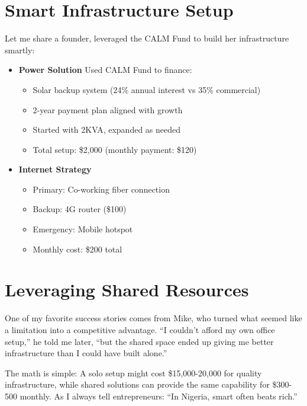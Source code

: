 \section{Smart Infrastructure Setup}\label{sec:smart-infrastructure}

Let me share a founder, leveraged the CALM Fund to build her infrastructure smartly:

\begin{itemize}
    \item \textbf{Power Solution}
    Used CALM Fund to finance:
    \begin{itemize}
        \item Solar backup system (24\% annual interest vs 35\% commercial)
        \item 2-year payment plan aligned with growth
        \item Started with 2KVA, expanded as needed
        \item Total setup: \$2,000 (monthly payment: \$120)
    \end{itemize}

    \item \textbf{Internet Strategy}
    \begin{itemize}
        \item Primary: Co-working fiber connection
        \item Backup: 4G router (\$100)
        \item Emergency: Mobile hotspot
        \item Monthly cost: \$200 total
    \end{itemize}
\end{itemize}

\section{Leveraging Shared Resources}\label{sec:shared-resources}

One of my favorite success stories comes from Mike, who turned what seemed like a limitation into a competitive advantage. ``I couldn't afford my own office setup,'' he told me later, ``but the shared space ended up giving me better infrastructure than I could have built alone.''

\begin{importantbox}
The math is simple: A solo setup might cost \$15,000-20,000 for quality infrastructure, while shared solutions can provide the same capability for \$300-500 monthly. As I always tell entrepreneurs: ``In Nigeria, smart often beats rich.''
\end{importantbox}


